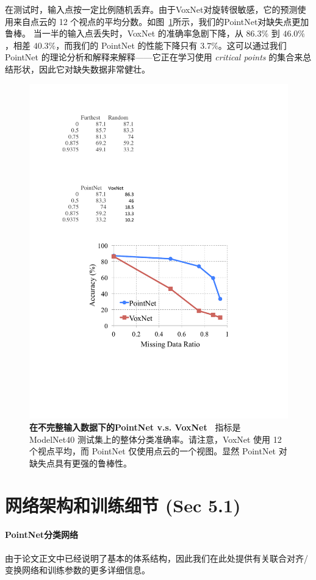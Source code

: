 在测试时，输入点按一定比例随机丢弃。由于VoxNet对旋转很敏感，它的预测使用来自点云的 12 个视点的平均分数。如图~\ref{fig:compare}所示，我们的PointNet对缺失点更加鲁棒。 当一半的输入点丢失时，VoxNet 的准确率急剧下降，从 $86.3\%$ 到 $46.0\%$，相差 $40.3\%$，而我们的 PointNet 的性能下降只有 $3.7\%$。这可以通过我们 PointNet 的理论分析和解释来解释——它正在学习使用 \textit{critical points} 的集合来总结形状，因此它对缺失数据非常健壮。


\begin{figure}[h!]
    \centering
    \includegraphics[width=0.7\linewidth]{fig/pointnet_vs_voxnet.pdf}
    \caption{\textbf{在不完整输入数据下的PointNet v.s. VoxNet~\cite{maturana2015voxnet} } 指标是 ModelNet40 测试集上的整体分类准确率。请注意，VoxNet 使用 12 个视点平均，而 PointNet 仅使用点云的一个视图。显然 PointNet 对缺失点具有更强的鲁棒性。}
    \label{fig:compare}
\end{figure}

\section{网络架构和训练细节 (Sec 5.1)}
\label{sec:network}
\paragraph{PointNet分类网络}由于论文正文中已经说明了基本的体系结构，因此我们在此处提供有关联合对齐/变换网络和训练参数的更多详细信息。

